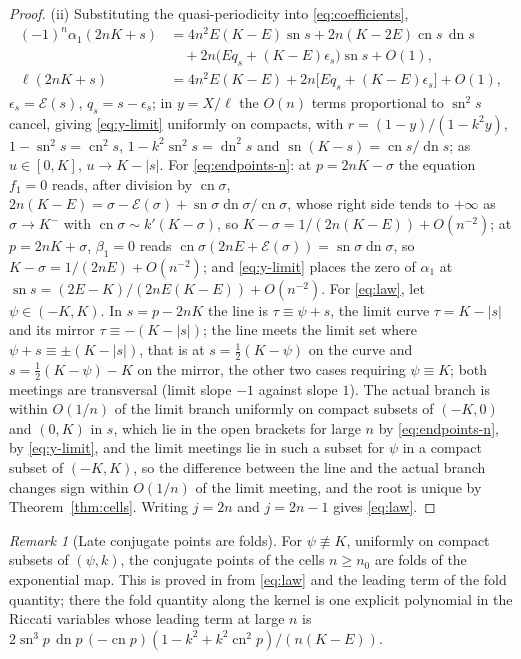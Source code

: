 \documentclass[11pt]{article}
\theoremstyle{remark}
\newtheorem{remark}[theorem]{Remark}
\newcommand{\sn}{\operatorname{sn}}
\newcommand{\cn}{\operatorname{cn}}
\newcommand{\dn}{\operatorname{dn}}
\newcommand{\epsi}{\mathcal{E}}
\begin{document}
\begin{proof}
(ii) Substituting the quasi-periodicity into \eqref{eq:coefficients},
\begin{align*}
 (-1)^n\alpha_1(2nK+s)&=4n^2E(K-E)\sn s+2n(K-2E)\cn s\,\dn s\\
 &\quad+2n\bigl(Eq_s+(K-E)\epsilon_s\bigr)\sn s+O(1),\\
 \ell(2nK+s)&=4n^2E(K-E)+2n\bigl[Eq_s+(K-E)\epsilon_s\bigr]+O(1),
\end{align*}
$\epsilon_s=\epsi(s)$, $q_s=s-\epsilon_s$; in $y=X/\ell$ the $O(n)$ terms
proportional to $\sn^2s$ cancel, giving \eqref{eq:y-limit} uniformly on
compacts, with $r=(1-y)/(1-k^2y)$, $1-\sn^2s=\cn^2s$, $1-k^2\sn^2s=\dn^2s$
and $\sn(K-s)=\cn s/\dn s$; as $u\in[0,K]$, $u\to K-|s|$.  For
\eqref{eq:endpoints-n}: at $p=2nK-\sigma$ the equation $f_1=0$ reads, after
division by $\cn\sigma$, $2n(K-E)=\sigma-\epsi(\sigma)+\sn\sigma\dn\sigma/\cn\sigma$,
whose right side tends to $+\infty$ as $\sigma\to K^-$ with
$\cn\sigma\sim k'(K-\sigma)$, so $K-\sigma=1/(2n(K-E))+O(n^{-2})$; at
$p=2nK+\sigma$, $\beta_1=0$ reads $\cn\sigma(2nE+\epsi(\sigma))=\sn\sigma\dn\sigma$,
so $K-\sigma=1/(2nE)+O(n^{-2})$; and \eqref{eq:y-limit} places the zero of
$\alpha_1$ at $\sn s=(2E-K)/(2nE(K-E))+O(n^{-2})$.  For \eqref{eq:law}, let
$\psi\in(-K,K)$.  In $s=p-2nK$ the line is $\tau\equiv\psi+s$, the limit
curve $\tau=K-|s|$ and its mirror $\tau\equiv-(K-|s|)$; the line meets the
limit set where $\psi+s\equiv\pm(K-|s|)$, that is at $s=\tfrac12(K-\psi)$
on the curve and $s=\tfrac12(K-\psi)-K$ on the mirror, the other two cases
requiring $\psi\equiv K$; both meetings are transversal (limit slope $-1$
against slope $1$).  The actual branch is within $O(1/n)$ of the limit
branch uniformly on compact subsets of $(-K,0)$ and $(0,K)$ in $s$, which
lie in the open brackets for large $n$ by \eqref{eq:endpoints-n}, by
\eqref{eq:y-limit}, and the limit meetings lie in such a subset for
$\psi$ in a compact subset of $(-K,K)$, so the difference
between the line and the actual branch changes sign within $O(1/n)$ of the
limit meeting, and the root is unique by Theorem~\ref{thm:cells}.  Writing
$j=2n$ and $j=2n-1$ gives \eqref{eq:law}.
\end{proof}

\begin{remark}[Late conjugate points are folds]
For $\psi\not\equiv K$, uniformly on compact subsets of $(\psi,k)$, the
conjugate points of the cells $n\ge n_0$ are folds of the exponential
map.  This is proved in \cite[Corollary~9.3]{SE2FirstCaustic} from
\eqref{eq:law} and the leading term of the fold quantity; there the fold
quantity along the kernel is one explicit polynomial in the
Riccati variables whose leading term at large $n$ is
$2\sn^3p\,\dn p\,(-\cn p)(1-k^2+k^2\cn^2p)/(n(K-E))$.
\end{remark}
\end{document}
